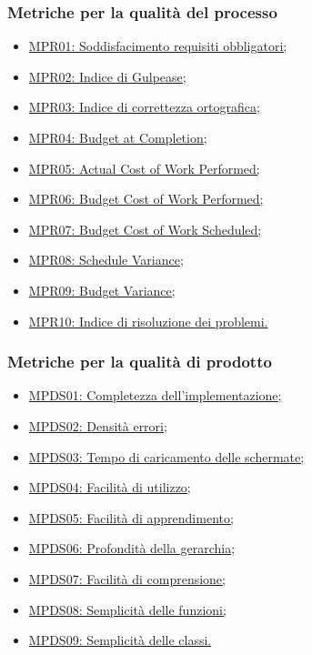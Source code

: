 \subsubsection{Metriche per la qualità del processo}
\begin{itemize}
	\item  \hyperlink{MSoddRequisiti}{MPR01: Soddisfacimento requisiti obbligatori;}
	\item  \hyperlink{MGulpease}{MPR02: Indice di Gulpease;}
	\item  \hyperlink{MOrtografia}{MPR03: Indice di correttezza ortografica;}
	\item  \hyperlink{MBC}{MPR04: Budget at Completion;}
	\item  \hyperlink{MACWP}{MPR05: Actual Cost of Work Performed;}
	\item  \hyperlink{MBCWP}{MPR06: Budget Cost of Work Performed;}
	\item  \hyperlink{MBCWS}{MPR07: Budget Cost of Work Scheduled;}
	\item  \hyperlink{MSV}{MPR08: Schedule Variance;}
	\item  \hyperlink{MBV}{MPR09: Budget Variance;}
	\item  \hyperlink{MProblemi}{MPR10: Indice di risoluzione dei problemi.} 
\end{itemize}

\subsubsection{Metriche per la qualità di prodotto}
\begin{itemize}
\item \hyperlink{MCImplementazione}{MPDS01: Completezza dell'implementazione;}
\item \hyperlink{MErrori}{MPDS02: Densità errori;}
\item \hyperlink{MCViste}{MPDS03: Tempo di caricamento delle schermate;}
\item \hyperlink{MFUtilizzo}{MPDS04: Facilità di utilizzo;}
\item \hyperlink{MFApprendimento}{MPDS05: Facilità di apprendimento;}
\item \hyperlink{MPGerarchia}{MPDS06: Profondità della gerarchia;}
\item \hyperlink{MSFComprensione}{MPDS07: Facilità di comprensione;}
\item \hyperlink{MSFunzioni}{MPDS08: Semplicità delle funzioni;}
\item \hyperlink{MSC}{MPDS09: Semplicità delle classi.}
\end{itemize}